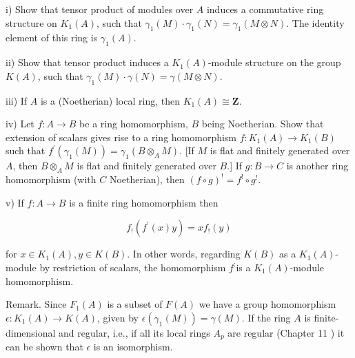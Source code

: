 \documentclass{standalone}
\theoremstyle{definition}
\theoremstyle{remark}
\begin{document}
i) Show that tensor product of modules over $A$ induces a commutative ring structure on $K_{1}(A)$, such that $\gamma_{1}(M) \cdot \gamma_{1}(N)=\gamma_{1}(M \otimes N)$. The identity element of this ring is $\gamma_{1}(A)$.

ii) Show that tensor product induces a $K_{1}(A)$-module structure on the group $K(A)$, such that $\gamma_{1}(M) \cdot \gamma(N)=\gamma(M \otimes N)$.

iii) If $A$ is a (Noetherian) local ring, then $K_{1}(A) \cong \mathbf{Z}$.

iv) Let $f: A \rightarrow B$ be a ring homomorphism, $B$ being Noetherian. Show that extension of scalars gives rise to a ring homomorphism $f: K_{1}(A) \rightarrow K_{1}(B)$ such that $f^{\prime}\left(\gamma_{1}(M)\right)=\gamma_{1}\left(B \otimes_{A} M\right)$. [If $M$ is flat and finitely generated over $A$, then $B \otimes_{A} M$ is flat and finitely generated over $B$.] If $g: B \rightarrow C$ is another ring homomorphism (with $C$ Noetherian), then $(f \circ g)^{!}=f^{!} \circ g^{!}$.

v) If $f: A \rightarrow B$ is a finite ring homomorphism then

\[
f_{!}\left(f^{\prime}(x) y\right)=x f_{!}(y)
\]

for $x \in K_{1}(A), y \in K(B)$. In other words, regarding $K(B)$ as a $K_{1}(A)$-module by restriction of scalars, the homomorphism $f^{:}$is a $K_{1}(A)$-module homomorphism.

Remark. Since $F_{1}(A)$ is a subset of $F(A)$ we have a group homomorphism $\epsilon: K_{1}(A) \rightarrow K(A)$, given by $\epsilon\left(\gamma_{1}(M)\right)=\gamma(M)$. If the ring $A$ is finite-dimensional and regular, i.e., if all its local rings $A_{p}$ are regular (Chapter 11 ) it can be shown that $\epsilon$ is an isomorphism.
\end{document}

